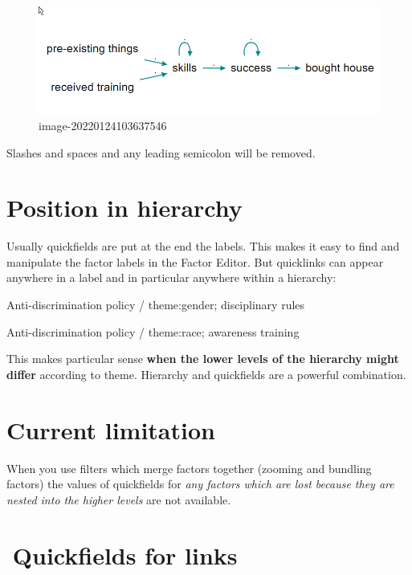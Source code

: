 \documentclass[
]{book}
\begin{document}
\begin{figure}
\centering
\includegraphics[width=6.77083in,height=\textheight]{_assets/image-20220124103637546.png}
\caption{image-20220124103637546}
\end{figure}

Slashes and spaces and any leading semicolon will be removed.

\hypertarget{position-in-hierarchy}{%
\section{Position in hierarchy}\label{position-in-hierarchy}}

Usually quickfields are put at the end the labels. This makes it easy to find and manipulate the factor labels in the Factor Editor. But quicklinks can appear anywhere in a label and in particular anywhere within a hierarchy:

Anti-discrimination policy / theme:gender; disciplinary rules

Anti-discrimination policy / theme:race; awareness training

This makes particular sense \textbf{when the lower levels of the hierarchy might differ} according to theme. Hierarchy and quickfields are a powerful combination.

\hypertarget{current-limitation}{%
\section{Current limitation}\label{current-limitation}}

When you use filters which merge factors together (zooming and bundling factors) the values of quickfields for \emph{any factors which are lost because they are nested into the higher levels} are not available.

\hypertarget{quickfields-for-links}{%
\section{🧪Quickfields for links}\label{quickfields-for-links}}
\end{document}
